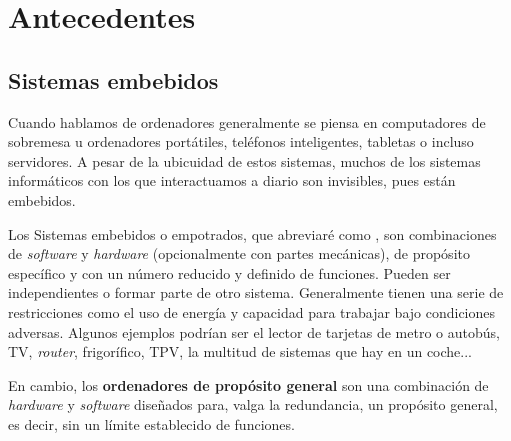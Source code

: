 \chapter{Antecedentes}



\section{Sistemas embebidos}
Cuando hablamos de ordenadores generalmente se piensa en computadores de sobremesa u  ordenadores portátiles, teléfonos inteligentes, tabletas o incluso servidores. A pesar de la ubicuidad de estos sistemas, muchos de los sistemas informáticos con los que interactuamos a diario son invisibles, pues están embebidos.

    Los Sistemas embebidos o empotrados, que abreviaré como , son combinaciones de \emph{software} y \emph{hardware} (opcionalmente con partes mecánicas), de propósito específico y con un número reducido y definido de funciones. Pueden ser independientes o formar parte de otro sistema. Generalmente tienen una serie de restricciones como el uso de energía y capacidad para trabajar bajo condiciones adversas. Algunos ejemplos podrían ser el lector de tarjetas de metro o autobús, TV, \emph{router}, frigorífico, TPV, la multitud de sistemas que hay en un coche... \cite{es_glossary} \cite{marwedel}

    En cambio, los \textbf{ordenadores de propósito general} son una combinación de \emph{hardware} y \emph{software} diseñados para, valga la redundancia, un propósito general, es decir, sin un límite establecido de funciones. \cite{es_glossary}\\

